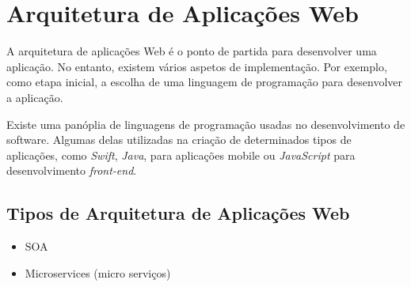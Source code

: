 \section{Arquitetura de Aplicações Web}
A arquitetura de aplicações Web é o ponto de partida  para desenvolver uma aplicação. No entanto, existem vários aspetos de implementação. Por exemplo, como etapa inicial, a escolha de uma linguagem de programação para desenvolver a aplicação.

Existe uma panóplia de linguagens de programação usadas no desenvolvimento de software. Algumas delas utilizadas na criação de determinados tipos de aplicações, como \textit{Swift}, \textit{Java}, para aplicações mobile ou \textit{JavaScript} para desenvolvimento \textit{front-end}.


\subsection{Tipos de Arquitetura de Aplicações Web}
\begin{itemize}
    \item \ac{SOA}
    \item Microservices (micro serviços)
\end{itemize}
